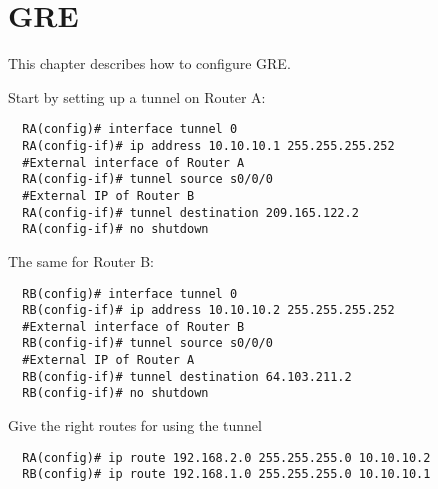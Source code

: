 \section{GRE}
This chapter describes how to configure GRE.

Start by setting up a tunnel on Router A:
\begin{verbatim}
  RA(config)# interface tunnel 0
  RA(config-if)# ip address 10.10.10.1 255.255.255.252
  #External interface of Router A
  RA(config-if)# tunnel source s0/0/0
  #External IP of Router B
  RA(config-if)# tunnel destination 209.165.122.2
  RA(config-if)# no shutdown
\end{verbatim}

The same for Router B:
\begin{verbatim}
  RB(config)# interface tunnel 0
  RB(config-if)# ip address 10.10.10.2 255.255.255.252
  #External interface of Router B
  RB(config-if)# tunnel source s0/0/0
  #External IP of Router A
  RB(config-if)# tunnel destination 64.103.211.2
  RB(config-if)# no shutdown
\end{verbatim}

Give the right routes for using the tunnel
\begin{verbatim}
  RA(config)# ip route 192.168.2.0 255.255.255.0 10.10.10.2
  RB(config)# ip route 192.168.1.0 255.255.255.0 10.10.10.1
\end{verbatim}

